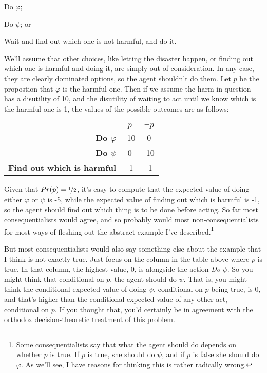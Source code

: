 \begin{itemize*}
\item Do \(\varphi\);
\item Do \(\psi\); or
\item Wait and find out which one is not harmful, and do it.
\end{itemize*}

\noindent We'll assume that other choices, like letting the disaster happen, or finding out which one is harmful and doing it, are simply out of consideration. In any case, they are clearly dominated options, so the agent shouldn't do them. Let \(p\) be the propostion that \(\varphi\) is the harmful one. Then if we assume the harm in question has a disutility of 10, and the disutility of waiting to act until we know which is the harmful one is 1, the values of the possible outcomes are as follows:

\begin{center}
\begin{tabular}{r c c}
 & \(p\) & \(\neg p\) \\
\textbf{Do \(\varphi\)} & -10 & 0 \\
\textbf{Do \(\psi\)} & 0 & -10 \\
\textbf{Find out which is harmful} & -1 & -1 \\
\end{tabular}
\end{center}

\noindent Given that \(Pr(p) = \nicefrac{1}{2}\), it's easy to compute that the expected value of doing either \(\varphi\) or \(\psi\) is -5, while the expected value of finding out which is harmful is -1, so the agent should find out which thing is to be done before acting. So far most consequentialists would agree, and so probably would most non-consequentialists for most ways of fleshing out the abstract example I've described.\footnote{Some consequentialists say that what the agent should do depends on whether \(p\) is true. If \(p\) is true, she should do \(\psi\), and if \(p\) is false she should do \(\varphi\). As we'll see, I have reasons for thinking this is rather radically wrong.}

But most consequentialists would also say something else about the example that I think is not exactly true. Just focus on the column in the table above where \(p\) is true. In that column, the highest value, 0, is alongside the action \textit{Do} \(\psi\). So you might think that conditional on \(p\), the agent should do \(\psi\). That is, you might think the conditional expected value of doing \(\psi\), conditional on \(p\) being true, is 0, and that's higher than the conditional expected value of any other act, conditional on \(p\). If you thought that, you'd certainly be in agreement with the orthodox decision-theoretic treatment of this problem.

